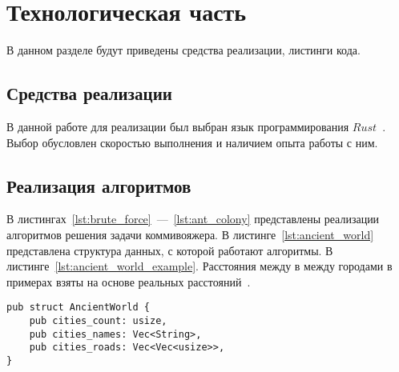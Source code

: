\chapter{Технологическая часть}

В данном разделе будут приведены средства реализации,  листинги кода.

\section{Средства реализации}

В данной работе для реализации был выбран язык программирования $Rust$~\cite{rust}. Выбор обусловлен скоростью выполнения и наличием опыта работы с ним.

\section{Реализация алгоритмов}

В листингах~\ref{lst:brute_force}~---~\ref{lst:ant_colony} представлены реализации алгоритмов решения задачи коммивояжера. В листинге~\ref{lst:ancient_world} представлена структура данных, с которой работают алгоритмы. В листинге~\ref{lst:ancient_world_example}. Расстояния между в между городами в примерах взяты на основе реальных расстояний~\cite{canaan, mesopotamia, ancient_rome}. 

\begin{center}
\captionsetup{justification=raggedright,singlelinecheck=off}
\begin{lstlisting}[label=lst:ancient_world,caption=структура AncientWorld]
pub struct AncientWorld {
    pub cities_count: usize,
    pub cities_names: Vec<String>,
    pub cities_roads: Vec<Vec<usize>>,
}
\end{lstlisting}
\end{center}

